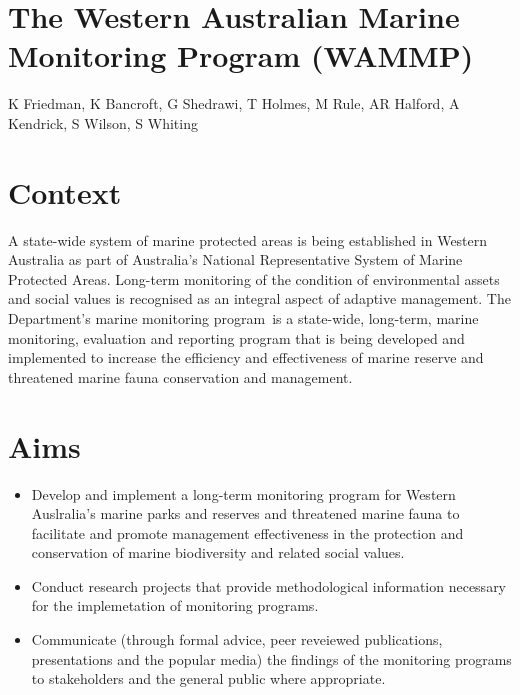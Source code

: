 \documentclass[version=last,
    paper=a4, %
    10pt, %
    usenames,
    dvipsnames,
    oneside, %
    headings=openany, %
    DIV=15 %
]{scrbook}
\begin{document}
\section*{The Western Australian Marine Monitoring Program (WAMMP)
}

K Friedman, K Bancroft, G Shedrawi, T Holmes, M Rule, AR Halford, A
Kendrick, S Wilson, S Whiting


\section*{Context}
A state-wide system of marine protected areas is being established in
Western Australia as part of Australia's National Representative System
of Marine Protected Areas. Long-term monitoring of the condition of
environmental assets and social values is recognised as an integral
aspect of adaptive management. The Department's marine monitoring
program~is a state-wide, long-term, marine monitoring, evaluation and
reporting program that is being developed and implemented to increase
the efficiency and effectiveness of marine reserve and threatened marine
fauna conservation and management.



\section*{Aims}
\begin{itemize}
\itemsep1pt\parskip0pt
\item
  Develop and implement a long-term monitoring program for Western
  Auslralia's marine parks and reserves and threatened marine fauna to
  facilitate and promote management effectiveness in the protection and
  conservation of marine biodiversity and related social values.
\item
  Conduct research projects that provide methodological information
  necessary for the implemetation of monitoring programs.
\item
  Communicate (through formal advice, peer reveiewed publications,
  presentations and the popular media) the findings of the monitoring
  programs to stakeholders and the general public where appropriate.
\end{itemize}
\end{document}

